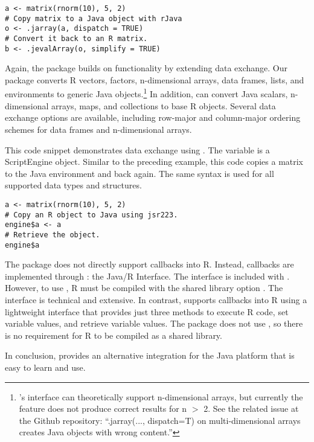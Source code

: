 \begin{verbatim}
a <- matrix(rnorm(10), 5, 2)
# Copy matrix to a Java object with rJava
o <- .jarray(a, dispatch = TRUE)
# Convert it back to an R matrix.
b <- .jevalArray(o, simplify = TRUE)
\end{verbatim}

Again, the  package builds on  functionality by extending data exchange. Our package converts R vectors, factors, n-dimensional arrays, data frames, lists, and environments to generic Java objects.\footnote{'s interface can theoretically support n-dimensional arrays, but currently the feature does not produce correct results for n $>$ 2. See the related issue at the  Github repository: ``.jarray(..., dispatch=T) on multi-dimensional arrays creates Java objects with wrong content.''} In addition,  can convert Java scalars, n-dimensional arrays, maps, and collections to base R objects. Several data exchange options are available, including row-major and column-major ordering schemes for data frames and n-dimensional arrays.

This code snippet demonstrates data exchange using . The variable  is a  ScriptEngine object. Similar to the preceding  example, this code copies a matrix to the Java environment and back again. The same syntax is used for all supported data types and structures.

\begin{verbatim}
a <- matrix(rnorm(10), 5, 2)
# Copy an R object to Java using jsr223.
engine$a <- a
# Retrieve the object.
engine$a
\end{verbatim}

The  package does not directly support callbacks into R. Instead, callbacks are implemented through : the Java/R Interface. The  interface is included with . However, to use , R must be compiled with the shared library option . The  interface is technical and extensive. In contrast,  supports callbacks into R using a lightweight interface that provides just three methods to execute R code, set variable values, and retrieve variable values. The  package does not use , so there is no requirement for R to be compiled as a shared library.

In conclusion,  provides an alternative integration for the Java platform that is easy to learn and use.

